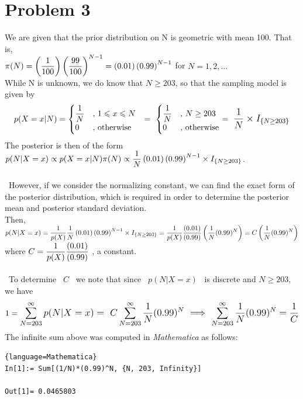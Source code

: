 \documentclass[10pt,a4paper]{article}
\begin{document}
\section{Problem 3}
We are given that the prior distribution on N is geometric with mean 100. That is, \\
$\mathlarger{\pi(N) = \left(\frac{1}{100}\right)\left(\frac{99}{100}\right)^{N-1} = \left(0.01\right)\left(0.99\right)^{N-1}}$ for $N = 1, 2,...$ \\
While N is unknown, we do know that $N \geq 203$, so that the sampling model is given by \[
  p(X = x \vert N) =
  \begin{cases}
                                   \mathlarger{\frac{1}{N}} & \text{, $1\leqslant x \leqslant N$} \\
                                   0 & \text{, otherwise}
  \end{cases} \ \ = \ \begin{cases}
                                   \mathlarger{\frac{1}{N}} & \text{, $N \geq 203$} \\
                                   0 & \text{, otherwise}
  \end{cases} = \ \mathlarger{\frac{1}{N}\times I_{\{N \geq 203\}}}
\]
The posterior is then of the form $p(N\vert X=x) \propto p(X = x\vert N)\pi(N) \propto \mathlarger{\frac{1}{N}\left(0.01\right)\left(0.99\right)^{N-1}\times I_{\{N \geq 203\}}}$.
\\\
\\\
However, if we consider the normalizing constant, we can find the exact form of the posterior distribution, which is required in order to determine the posterior mean and posterior standard deviation.\\
Then, $p(N\vert X=x) = \mathlarger{\frac{1}{p(X)}\frac{1}{N}\left(0.01\right)\left(0.99\right)^{N-1}\times I_{\{N \geq 203\}} = \frac{1}{p(X)}\frac{(0.01)}{(0.99)}\left(\frac{1}{N}(0.99)^N\right) = C\left(\frac{1}{N}(0.99)^N\right)}$ \\
where $C = \mathlarger{\frac{1}{p(X)}\frac{(0.01)}{(0.99)}}$ , a constant.\\
\\\
To determine \ $C$ \ we note that since \ $p(N\vert X=x)$ \ is discrete and $N \geq 203$, we have $$1 = \mathlarger{\sum_{N = 203}^{\infty}p(N\vert X=x) = \ C\sum_{N = 203}^{\infty}\frac{1}{N}(0.99)^N \ \Longrightarrow \ \sum_{N = 203}^{\infty}\frac{1}{N}(0.99)^N = \frac{1}{C}}$$
The infinite sum above was computed in \textit{Mathematica} as follows:
\begin{lstlisting}{language=Mathematica}
In[1]:= Sum[(1/N)*(0.99)^N, {N, 203, Infinity}]

Out[1]= 0.0465803
\end{lstlisting}
\end{document}
